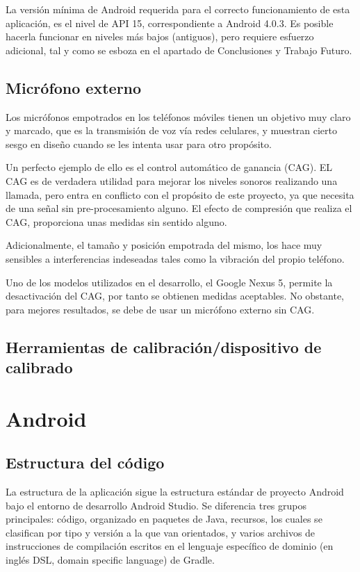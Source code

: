 La versión mínima de Android requerida para el correcto funcionamiento de esta aplicación, es el nivel de API 15, correspondiente a Android 4.0.3. Es posible hacerla funcionar en niveles más bajos (antiguos), pero requiere esfuerzo adicional, tal y como se esboza en el apartado de Conclusiones y Trabajo Futuro.

\subsection{Micrófono externo}

Los micrófonos empotrados en los teléfonos móviles tienen un objetivo muy claro y marcado, que es la transmisión de voz vía redes celulares, y muestran cierto sesgo en diseño cuando se les intenta usar para otro propósito.

Un perfecto ejemplo de ello es el control automático de ganancia (CAG). EL CAG es de verdadera utilidad para mejorar los niveles sonoros realizando una llamada, pero entra en conflicto con el propósito de este proyecto, ya que necesita de una señal sin pre-procesamiento alguno. El efecto de compresión que realiza el CAG, proporciona unas medidas sin sentido alguno.

Adicionalmente, el tamaño y posición empotrada del mismo, los hace muy sensibles a interferencias indeseadas tales como la vibración del propio teléfono.

Uno de los modelos utilizados en el desarrollo, el Google Nexus 5, permite la desactivación del CAG, por tanto se obtienen medidas aceptables. No obstante, para mejores resultados, se debe de usar un micrófono externo sin CAG.

\subsection{Herramientas de calibración/dispositivo de calibrado}

\section{Android}

\subsection{Estructura del código}

La estructura de la aplicación sigue la estructura estándar de proyecto Android bajo el entorno de desarrollo Android Studio. Se diferencia tres grupos principales: código, organizado en paquetes de Java, recursos, los cuales se clasifican por tipo y versión a la que van orientados, y varios archivos de instrucciones de compilación escritos en el lenguaje específico de dominio (en inglés DSL, domain specific language) de Gradle.
 
